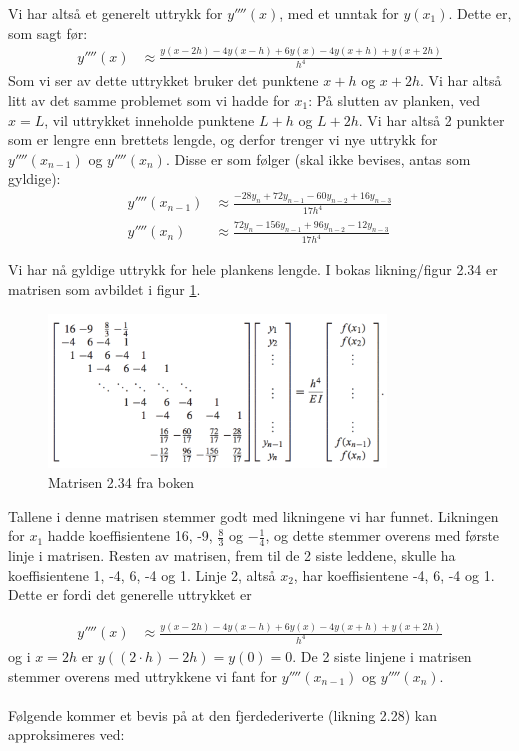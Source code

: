 Vi har altså et generelt uttrykk for $y''''(x)$, med et unntak for $y(x_1)$. Dette er, som sagt før: 
\begin{align}
     y''''(x)& \approx \frac{y(x-2h)-4y(x-h)+6y(x)-4y(x+h)+y(x+2h)}{h^4}
 \end{align} 
 Som vi ser av dette uttrykket bruker det punktene $x+h$ og $x+2h$. Vi har altså litt av det samme problemet som vi hadde for $x_1$: På slutten av planken, ved $x=L$, vil uttrykket inneholde punktene $L+h$ og $L+2h$. Vi har altså 2 punkter som er lengre enn brettets lengde, og derfor trenger vi nye uttrykk for $y''''(x_{n-1})$ og $y''''(x_n)$. Disse er som følger (skal ikke bevises, antas som gyldige): 
\begin{align}
    y''''(x_{n-1})&\approx \frac{-28y_n+72y_{n-1}-60y_{n-2}+16y_{n-3}}{17h^4} \\
    y''''(x_n)&\approx \frac{72y_n-156y_{n-1}+96y_{n-2}-12y_{n-3}}{17h^4}
\end{align}

Vi har nå gyldige uttrykk for hele plankens lengde. I bokas likning/figur 2.34 er matrisen som avbildet i figur \ref{fig:EBMatrix}. 
\begin{figure}[h]
    \centering
    \includegraphics[width=0.8\textwidth]{sections/Theory/EBMatrix}
    \caption{Matrisen 2.34 fra boken}
    \label{fig:EBMatrix}
\end{figure}
Tallene i denne matrisen stemmer godt med likningene vi har funnet. Likningen for $x_1$ hadde koeffisientene 16, -9, $\frac{8}{3}$ og $-\frac{1}{4}$, og dette stemmer overens med første linje i matrisen. Resten av matrisen, frem til de 2 siste leddene, skulle ha koeffisientene 1, -4, 6, -4 og 1. Linje 2, altså $x_2$, har koeffisientene -4, 6, -4 og 1. Dette er fordi det generelle uttrykket er 

\begin{align}
    y''''(x)& \approx \frac{y(x-2h)-4y(x-h)+6y(x)-4y(x+h)+y(x+2h)}{h^4} \nonumber
\end{align}
og i $x=2h$ er $y((2\cdot h)-2h)=y(0)=0$. De 2 siste linjene i matrisen stemmer overens med uttrykkene vi fant for $y''''(x_{n-1})$ og $y''''(x_n)$. 
\\ \\
Følgende kommer et bevis på at den fjerdederiverte (likning 2.28) kan approksimeres ved: 

